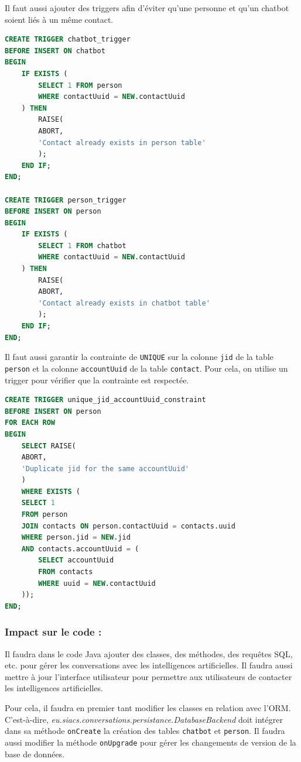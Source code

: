 \documentclass[a4paper,11pt]{article}
\begin{document}
Il faut aussi ajouter des triggers afin d'éviter qu'une personne et qu'un chatbot   soient liés à un même contact.

\begin{lstlisting}[language=SQL]
CREATE TRIGGER chatbot_trigger
BEFORE INSERT ON chatbot
BEGIN
	IF EXISTS (
		SELECT 1 FROM person 
		WHERE contactUuid = NEW.contactUuid
	) THEN
		RAISE(
		ABORT, 
		'Contact already exists in person table'
		);
	END IF;
END;

CREATE TRIGGER person_trigger
BEFORE INSERT ON person
BEGIN
	IF EXISTS (
		SELECT 1 FROM chatbot
		WHERE contactUuid = NEW.contactUuid
	) THEN
		RAISE(
		ABORT,
		'Contact already exists in chatbot table'
		);
	END IF;
END;
\end{lstlisting}

Il faut aussi garantir la contrainte de \texttt{UNIQUE} sur la colonne \texttt{jid} de la table \texttt{person} et la colonne \texttt{accountUuid} de la table \texttt{contact}. Pour cela, on utilise un trigger pour vérifier que la contrainte est respectée.

\begin{lstlisting}[language=SQL]
CREATE TRIGGER unique_jid_accountUuid_constraint
BEFORE INSERT ON person
FOR EACH ROW
BEGIN
	SELECT RAISE(
	ABORT,
	'Duplicate jid for the same accountUuid'
	) 
	WHERE EXISTS (
	SELECT 1 
	FROM person
	JOIN contacts ON person.contactUuid = contacts.uuid
	WHERE person.jid = NEW.jid
	AND contacts.accountUuid = (
		SELECT accountUuid 
		FROM contacts 
		WHERE uuid = NEW.contactUuid
	));
END;
\end{lstlisting}

\subsubsection*{Impact sur le code :}

Il faudra dans le code Java ajouter des classes, des méthodes, des requêtes SQL, etc. pour gérer les conversations avec les intelligences artificielles. Il faudra aussi mettre à jour l'interface utilisateur pour permettre aux utilisateurs de contacter les intelligences artificielles.

Pour cela, il faudra en premier tant modifier les classes en relation avec l'ORM. C'est-à-dire, \textit{eu.siacs.conversations.persistance.DatabaseBackend} doit intégrer dans sa méthode \texttt{onCreate} la création des tables \texttt{chatbot} et \texttt{person}. Il faudra aussi modifier la méthode \texttt{onUpgrade} pour gérer les changements de version de la base de données.
\end{document}
